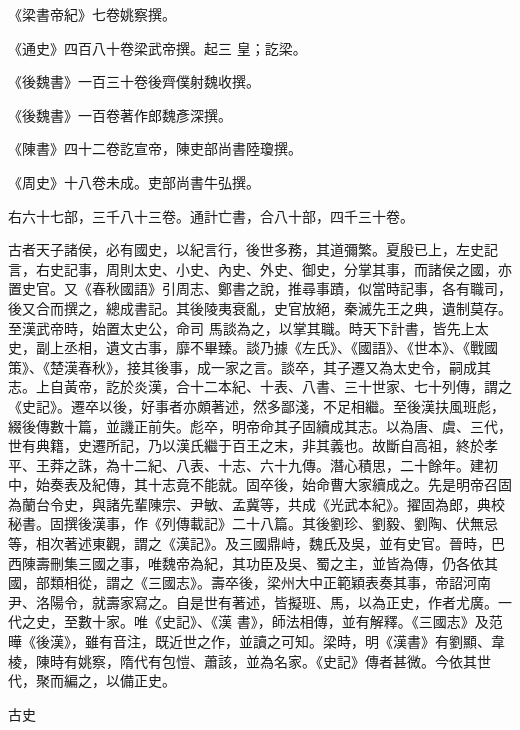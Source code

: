 \begin{pinyinscope}
 《梁書帝紀》七卷姚察撰。



 《通史》四百八十卷梁武帝撰。起三
 皇；訖梁。



 《後魏書》一百三十卷後齊僕射魏收撰。



 《後魏書》一百卷著作郎魏彥深撰。



 《陳書》四十二卷訖宣帝，陳吏部尚書陸瓊撰。



 《周史》十八卷未成。吏部尚書牛弘撰。



 右六十七部，三千八十三卷。通計亡書，合八十部，四千三十卷。



 古者天子諸侯，必有國史，以紀言行，後世多務，其道彌繁。夏殷已上，左史記言，右史記事，周則太史、小史、內史、外史、御史，分掌其事，而諸侯之國，亦置史官。又《春秋國語》引周志、鄭書之說，推尋事蹟，似當時記事，各有職司，後又合而撰之，總成書記。其後陵夷衰亂，史官放絕，秦滅先王之典，遺制莫存。至漢武帝時，始置太史公，命司
 馬談為之，以掌其職。時天下計書，皆先上太史，副上丞相，遺文古事，靡不畢臻。談乃據《左氏》、《國語》、《世本》、《戰國策》、《楚漢春秋》，接其後事，成一家之言。談卒，其子遷又為太史令，嗣成其志。上自黃帝，訖於炎漢，合十二本紀、十表、八書、三十世家、七十列傳，謂之《史記》。遷卒以後，好事者亦頗著述，然多鄙淺，不足相繼。至後漢扶風班彪，綴後傳數十篇，並譏正前失。彪卒，明帝命其子固續成其志。以為唐、虞、三代，世有典籍，史遷所記，乃以漢氏繼于百王之末，非其義也。故斷自高祖，終於孝平、王莽之誅，為十二紀、八表、十志、六十九傳。潛心積思，二十餘年。建初
 中，始奏表及紀傳，其十志竟不能就。固卒後，始命曹大家續成之。先是明帝召固為蘭台令史，與諸先輩陳宗、尹敏、孟冀等，共成《光武本紀》。擢固為郎，典校秘書。固撰後漢事，作《列傳載記》二十八篇。其後劉珍、劉毅、劉陶、伏無忌等，相次著述東觀，謂之《漢記》。及三國鼎峙，魏氏及吳，並有史官。晉時，巴西陳壽刪集三國之事，唯魏帝為紀，其功臣及吳、蜀之主，並皆為傳，仍各依其國，部類相從，謂之《三國志》。壽卒後，梁州大中正範穎表奏其事，帝詔河南尹、洛陽令，就壽家寫之。自是世有著述，皆擬班、馬，以為正史，作者尤廣。一代之史，至數十家。唯《史記》、《漢
 書》，師法相傳，並有解釋。《三國志》及范曄《後漢》，雖有音注，既近世之作，並讀之可知。梁時，明《漢書》有劉顯、韋棱，陳時有姚察，隋代有包愷、蕭該，並為名家。《史記》傳者甚微。今依其世代，聚而編之，以備正史。



 古史




\end{pinyinscope}
